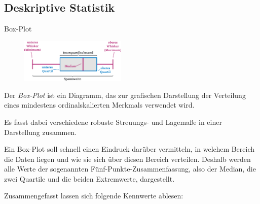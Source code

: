 \subsection{Deskriptive Statistik}

\begin{defi}{Box-Plot}
    \begin{figure}
        \centering
        \includegraphics[width=0.45\textwidth]{includes/figures/definition_boxplot.png}
    \end{figure}%
    Der \emph{Box-Plot} ist ein Diagramm, das zur grafischen Darstellung der Verteilung eines mindestens ordinalskalierten Merkmals verwendet wird.

    Es fasst dabei verschiedene robuste Streuungs- und Lagemaße in einer Darstellung zusammen.

    Ein Box-Plot soll schnell einen Eindruck darüber vermitteln, in welchem Bereich die Daten liegen und wie sie sich über diesen Bereich verteilen. Deshalb werden alle Werte der sogenannten Fünf-Punkte-Zusammenfassung, also der Median, die zwei Quartile und die beiden Extremwerte, dargestellt.

    Zusammengefasst lassen sich folgende Kennwerte ablesen:


\end{defi}
